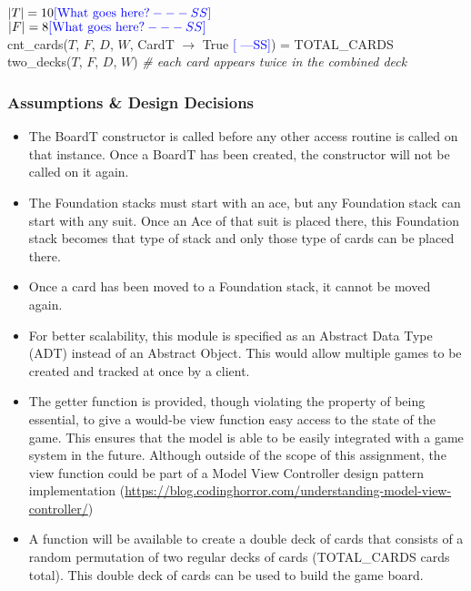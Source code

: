 \documentclass[12pt]{article}
\newcommand{\authornote}[3]{\textcolor{#1}{[#3 ---#2]}}
\newcommand{\authornote}[3]{}
\newcommand{\wss}[1]{\authornote{blue}{SS}{#1}}
\begin{document}
$|T| = 10 \wss{\text{What goes here?}}$\\
$|F| = 8 \wss{\text{What goes here?}}$\\
cnt\_cards($T$, $F$, $D$, $W$, CardT $\rightarrow$ True \wss{}) = TOTAL\_CARDS\\
two\_decks($T$, $F$, $D$, $W$) \textit{\# each card appears twice in the combined deck}

\subsubsection* {Assumptions \& Design Decisions}

\begin{itemize}

\item The BoardT constructor is called before any other access
  routine is called on that instance. Once a BoardT has been created, the
  constructor will not be called on it again.

\item The Foundation stacks must start with an ace, but any Foundation stack can
  start with any suit. Once an Ace of that suit is placed there, this Foundation
  stack becomes that type of stack and only those type of cards can be placed
  there.

\item Once a card has been moved to a Foundation stack, it cannot be moved again.

\item For better scalability, this module is specified as an Abstract Data Type
  (ADT) instead of an Abstract Object. This would allow multiple games to be
  created and tracked at once by a client.

\item The getter function is provided, though violating the property of being
  essential, to give a would-be view function easy access to the state of the
  game. This ensures that the model is able to be easily integrated with a game
  system in the future.  Although outside of the scope of this assignment, the
  view function could be part of a Model View Controller design pattern implementation
  (\url{https://blog.codinghorror.com/understanding-model-view-controller/})

\item A function will be available to create a double deck of cards that
  consists of a random permutation of two regular decks of cards (TOTAL\_CARDS
  cards total).  This double deck of cards can be used to build the game board.

\end{itemize}
\end{document}
